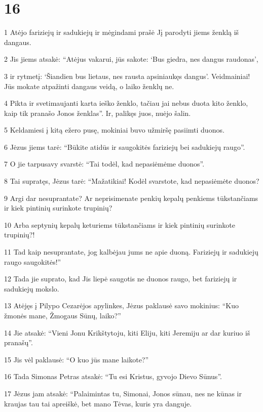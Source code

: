 \chapter{16}


\par 1 Atėjo fariziejų ir sadukiejų ir mėgindami prašė Jį parodyti jiems ženklą iš dangaus. 
\par 2 Jis jiems atsakė: “Atėjus vakarui, jūs sakote: ‘Bus giedra, nes dangus raudonas’, 
\par 3 ir rytmetį: ‘Šiandien bus lietaus, nes rausta apsiniaukęs dangus’. Veidmainiai! Jūs mokate atpažinti dangaus veidą, o laiko ženklų­ ne. 
\par 4 Pikta ir svetimaujanti karta ieško ženklo, tačiau jai nebus duota kito ženklo, kaip tik pranašo Jonos ženklas”. Ir, palikęs juos, nuėjo šalin. 
\par 5 Keldamiesi į kitą ežero pusę, mokiniai buvo užmiršę pasiimti duonos. 
\par 6 Jėzus jiems tarė: “Būkite atidūs ir saugokitės fariziejų bei sadukiejų raugo”. 
\par 7 O jie tarpusavy svarstė: “Tai todėl, kad nepasiėmėme duonos”. 
\par 8 Tai supratęs, Jėzus tarė: “Mažatikiai! Kodėl svarstote, kad nepasiėmėte duonos? 
\par 9 Argi dar nesuprantate? Ar neprisimenate penkių kepalų penkiems tūkstančiams ir kiek pintinių surinkote trupinių? 
\par 10 Arba septynių kepalų keturiems tūkstančiams ir kiek pintinių surinkote trupinių?! 
\par 11 Tad kaip nesuprantate, jog kalbėjau jums ne apie duoną. Fariziejų ir sadukiejų raugo saugokitės!” 
\par 12 Tada jie suprato, kad Jis liepė saugotis ne duonos raugo, bet fariziejų ir sadukiejų mokslo. 
\par 13 Atėjęs į Pilypo Cezarėjos apylinkes, Jėzus paklausė savo mokinius: “Kuo žmonės mane, Žmogaus Sūnų, laiko?” 
\par 14 Jie atsakė: “Vieni Jonu Krikštytoju, kiti Eliju, kiti Jeremiju ar dar kuriuo iš pranašų”. 
\par 15 Jis vėl paklausė: “O kuo jūs mane laikote?” 
\par 16 Tada Simonas Petras atsakė: “Tu esi Kristus, gyvojo Dievo Sūnus”. 
\par 17 Jėzus jam atsakė: “Palaimintas tu, Simonai, Jonos sūnau, nes ne kūnas ir kraujas tau tai apreiškė, bet mano Tėvas, kuris yra danguje. 

